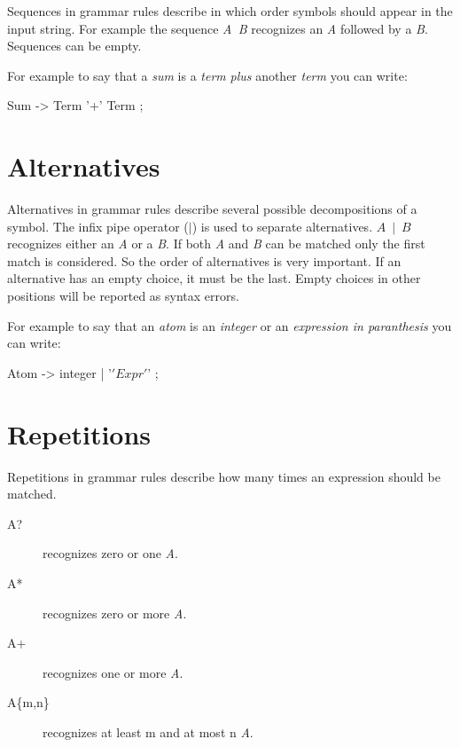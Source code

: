 Sequences in grammar rules describe in which order symbols should appear in the input string.
For example the sequence \emph{A~B} recognizes an \emph{A} followed by a \emph{B}.
Sequences can be empty.

For example to say that a \emph{sum} is a \emph{term} \emph{plus} another \emph{term} you can write:
\begin{verbatimtab}[4]
    Sum -> Term '+' Term ;
\end{verbatimtab}

\section{Alternatives}                                          \label{parser:alternatives}

Alternatives in grammar rules describe several possible decompositions of a symbol.
The infix pipe operator (\emph{$\mid$}) is used to separate alternatives.
\emph{$A~\mid~B$} recognizes either an \emph{A} or a \emph{B}.
If both \emph{A} and \emph{B} can be matched only the first match is considered.
So the order of alternatives is very important.
If an alternative has an empty choice, it must be the last.
Empty choices in other positions will be reported as syntax errors.

For example to say that an \emph{atom} is an \emph{integer} or an \emph{expression in paranthesis}
you can write:
\begin{verbatimtab}[4]
    Atom -> integer | '\(' Expr '\)' ;
\end{verbatimtab}

\section{Repetitions}                                           \label{parser:repetitions}

Repetitions in grammar rules describe how many times an expression should be matched.

\begin{description}
    \item [A?] recognizes zero or one \emph{A}.
    \item [A*] recognizes zero or more \emph{A}.
    \item [A+] recognizes one or more \emph{A}.
    \item [A\{m,n\}] recognizes at least m and at most n \emph{A}.
\end{description}


